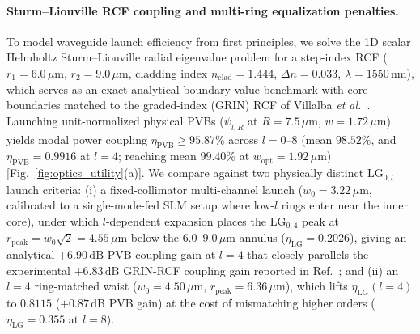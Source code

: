 \documentclass[aps,pra,reprint,amsmath,amssymb,floatfix,longbibliography]{revtex4-2}
\begin{document}
\paragraph*{Sturm--Liouville RCF coupling and multi-ring equalization penalties.}
To model waveguide launch efficiency from first principles, we solve the 1D scalar Helmholtz Sturm--Liouville radial eigenvalue problem for a step-index RCF ($r_1 = 6.0\,\mu\mathrm{m}$, $r_2 = 9.0\,\mu\mathrm{m}$, cladding index $n_{\mathrm{clad}} = 1.444$, $\Delta n = 0.033$, $\lambda = 1550\,\mathrm{nm}$), which serves as an exact analytical boundary-value benchmark with core boundaries matched to the graded-index (GRIN) RCF of Villalba \emph{et al.}~\cite{Villalba2023}. Launching unit-normalized physical PVBs ($\psi_{l,R}$ at $R = 7.5\,\mu\mathrm{m}$, $w = 1.72\,\mu\mathrm{m}$) yields modal power coupling $\eta_{\mathrm{PVB}} \ge 95.87\%$ across $l = 0\text{--}8$ (mean $98.52\%$, and $\eta_{\mathrm{PVB}} = 0.9916$ at $l = 4$; reaching mean $99.40\%$ at $w_{\mathrm{opt}} = 1.92\,\mu\mathrm{m}$) [Fig.~\ref{fig:optics_utility}(a)]. We compare against two physically distinct $\mathrm{LG}_{0,l}$ launch criteria: (i) a fixed-collimator multi-channel launch ($w_0 = 3.22\,\mu\mathrm{m}$, calibrated to a single-mode-fed SLM setup where low-$l$ rings enter near the inner core), under which $l$-dependent expansion places the $\mathrm{LG}_{0,4}$ peak at $r_{\mathrm{peak}} = w_0\sqrt{2} = 4.55\,\mu\mathrm{m}$ below the $6.0\text{--}9.0\,\mu\mathrm{m}$ annulus ($\eta_{\mathrm{LG}} = 0.2026$), giving an analytical $+6.90\,\mathrm{dB}$ PVB coupling gain at $l = 4$ that closely parallels the experimental $+6.83\,\mathrm{dB}$ GRIN-RCF coupling gain reported in Ref.~\cite{Villalba2023}; and (ii) an $l = 4$ ring-matched waist ($w_0 = 4.50\,\mu\mathrm{m}$, $r_{\mathrm{peak}} = 6.36\,\mu\mathrm{m}$), which lifts $\eta_{\mathrm{LG}}(l=4)$ to $0.8115$ ($+0.87\,\mathrm{dB}$ PVB gain) at the cost of mismatching higher orders ($\eta_{\mathrm{LG}} = 0.355$ at $l = 8$).
\end{document}
